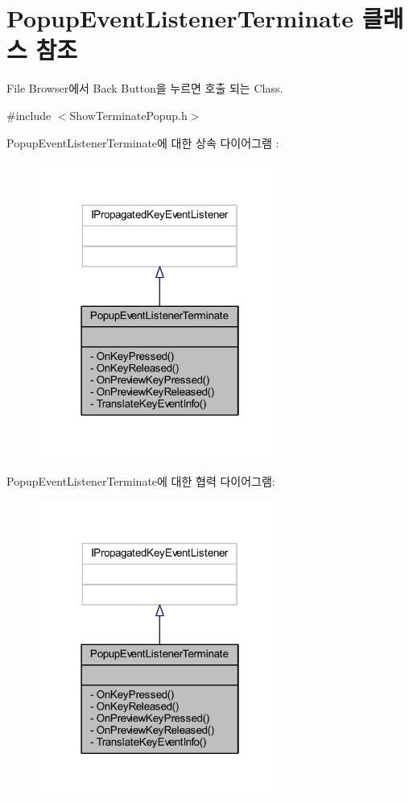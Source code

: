\hypertarget{class_popup_event_listener_terminate}{\section{Popup\+Event\+Listener\+Terminate 클래스 참조}
\label{class_popup_event_listener_terminate}
}


File Browser에서 Back Button을 누르면 호출 되는 Class.  




{\ttfamily \#include $<$Show\+Terminate\+Popup.\+h$>$}



Popup\+Event\+Listener\+Terminate에 대한 상속 다이어그램 \+: 
\nopagebreak
\begin{figure}[H]
\begin{center}
\leavevmode
\includegraphics[width=226pt]{class_popup_event_listener_terminate__inherit__graph}
\end{center}
\end{figure}


Popup\+Event\+Listener\+Terminate에 대한 협력 다이어그램\+:
\nopagebreak
\begin{figure}[H]
\begin{center}
\leavevmode
\includegraphics[width=226pt]{class_popup_event_listener_terminate__coll__graph}
\end{center}
\end{figure}

